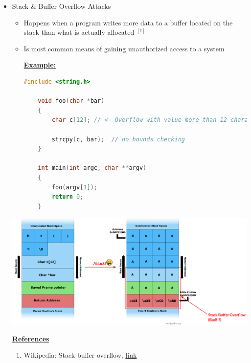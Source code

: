 \documentclass[12pt]{article}
\begin{document}
\begin{itemize}
    \item Stack \& Buffer Overflow Attacks
    \begin{itemize}
        \item Happens when a program writes more data to a buffer located on the
        stack than what is actually allocated $^{[1]}$
        \item Is most common means of gaining unauthorized access to a system

        \bigskip

        \underline{\textbf{Example:}}

        \bigskip

    \begin{lstlisting}[language=c]
    #include <string.h>

    void foo(char *bar)
    {
        char c[12]; // <- Overflow with value more than 12 characters in length

        strcpy(c, bar);  // no bounds checking
    }

    int main(int argc, char **argv)
    {
        foo(argv[1]);
        return 0;
    }
    \end{lstlisting}

    \bigskip

    \end{itemize}

    \begin{center}
        \includegraphics[width=\linewidth]{images/week_11_notes_1_5.png}
    \end{center}

    \bigskip

    \underline{\textbf{References}}

    \bigskip

    \begin{enumerate}[1)]
        \item Wikipedia: Stack buffer overflow, \href{https://en.wikipedia.org/wiki/Stack_buffer_overflow}{link}
    \end{enumerate}


\end{itemize}
\end{document}
